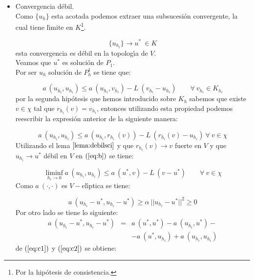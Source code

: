 \begin{demosteorema}
\begin{itemize}
\item Convergencia d\'ebil.\\

Como $\{ u_h \}$ esta acotada podemos extraer una subsucesi\'on convergente, la
cual tiene l\'{\i}mite en $K$\footnote{Por la hip\'otesis de consistencia.}.

\begin{displaymath}
\{ u_{h_i} \} \longrightarrow u^* \ \in K
\end{displaymath}
esta convergencia es d\'ebil en la topolog\'{\i}a de $V$.\\

Veamos que $u^*$ es soluci\'on de $P_1$.\\

Por ser $u_h$ soluci\'on de $P^1_h$ se tiene que:

\begin{displaymath}
a\ (u_{h_i}, u_{h_i}) \le a\ (u_{h_i},v_{h_i}) - L\ (v_{h_i}-u_{h_i})\qquad
\forall \ v_{h_i} \in K_{h_i}
\end{displaymath}
por la segunda hip\'otesis que hemos introducido sobre $K_h$ sabemos que existe
$v \in \chi$ tal que $r_{h_i} (v) = v_{h_i}$, entonces utilizando esta
propiedad podemos reescribir la expresi\'on anterior de la siguiente manera:

\begin{equation} \label{eq:b}
a\ (u_{h_i},u_{h_i}) \le a\ (u_{h_i},r_{h_i}\ (v))-L\ (r_{h_i} (v) - u_{h_i})
\ \forall \ v \in \chi
\end{equation}
Utilizando el lema $\ref{lema:debilsci}$ y que $r_{h_i}(v)\to v$ fuerte en $V$
y que $u_{h_i}\to u^*$ d\'ebil en $V$ en $(\ref{eq:b})$ se tiene:

\begin{equation} \label{eq:c}
\liminf_{h_i \to 0} a\ (u_{h_i},u_{h_i}) \le a\ (u^*,v)-L\ (v-u^*)\qquad \forall
\ v \in \chi
\end{equation}
Como $a\ (\cdot ,\cdot )$ es $V-$el\'{\i}ptica se tiene:

\begin{equation} \label{eq:c1}
a\ (u_{h_i}-u^*,u_{h_i}-u^*)\ge \alpha \ ||u_{h_i}-u^*||^2 \ge 0
\end{equation}
Por otro lado se tiene lo siguiente:
\begin{eqnarray} \label{eq:c2}
a\ (u_{h_i}-u^*,u_{h_i}-u^*)& =& a\ (u^*,u^*)-a\ (u_{h_i},u^*)-
\\ \nonumber
& &-a\ (u^*,u_{h_i})+a\ (u_{h_i},u_{h_i})
\end{eqnarray}
de $(\ref{eq:c1})$ y $(\ref{eq:c2})$ se obtiene:


\end{itemize}
\end{demosteorema}
